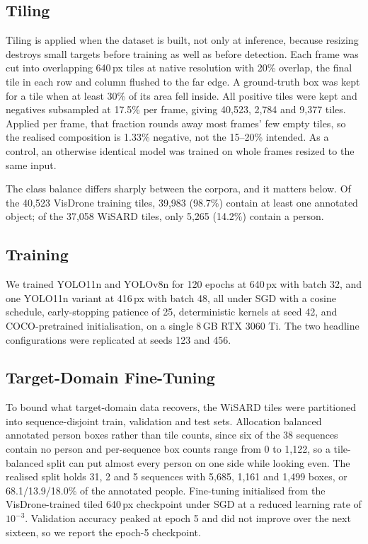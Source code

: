 \documentclass[conference]{IEEEtran}
\begin{document}
\subsection{Tiling}

Tiling is applied when the dataset is built, not only at inference, because
resizing destroys small targets before training as well as before detection.
Each frame was cut into overlapping 640\,px tiles at native resolution with 20\%
overlap, the final tile in each row and column flushed to the far edge. A
ground-truth box was kept for a tile when at least 30\% of its area fell inside.
All positive tiles were kept and negatives subsampled at 17.5\% per frame,
giving 40,523, 2,784 and 9,377 tiles. Applied per frame, that fraction rounds
away most frames' few empty tiles, so the realised composition is 1.33\%
negative, not the 15--20\% intended. As a control, an otherwise identical model
was trained on whole frames resized to the same input.

The class balance differs sharply between the corpora, and it matters below. Of
the 40,523 VisDrone training tiles, 39,983 (98.7\%) contain at least one
annotated object; of the 37,058 WiSARD tiles, only 5,265 (14.2\%) contain a
person.

\subsection{Training}

We trained YOLO11n and YOLOv8n for 120 epochs at 640\,px with batch 32, and one
YOLO11n variant at 416\,px with batch 48, all under SGD with a cosine schedule,
early-stopping patience of 25, deterministic kernels at seed 42, and
COCO-pretrained initialisation, on a single 8\,GB RTX 3060 Ti. The two headline
configurations were replicated at seeds 123 and 456.

\subsection{Target-Domain Fine-Tuning}

To bound what target-domain data recovers, the WiSARD tiles were partitioned
into sequence-disjoint train, validation and test sets. Allocation balanced
annotated person boxes rather than tile counts, since six of the 38 sequences
contain no person and per-sequence box counts range from 0 to 1,122, so a
tile-balanced split can put almost every person on one side while looking even.
The realised split holds 31, 2 and 5 sequences with 5,685, 1,161 and 1,499
boxes, or 68.1/13.9/18.0\% of the annotated people. Fine-tuning initialised from
the VisDrone-trained tiled 640\,px checkpoint under SGD at a reduced learning
rate of $10^{-3}$. Validation accuracy peaked at epoch 5 and did not improve
over the next sixteen, so we report the epoch-5 checkpoint.
\end{document}

